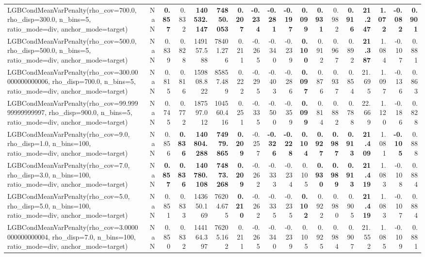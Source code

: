 \documentclass[11pt]{article}
\theoremstyle{plain}
\theoremstyle{definition}
\newcommand{\1}{\mathbf{1}}
\begin{document}
\begin{table}[htbp]
{\begin{tabular}{lrrrrrrrrrrrrrrrrr}
LGBCondMeanVarPenalty(rho\_cov=700.0, rho\_disp=300.0, n\_bins=5, ratio\_mode=div, anchor\_mode=target) & NaN & \textbf{0.857} & 0.832 & \textbf{140532.147} & \textbf{74850.053} & \textbf{0.207} & \textbf{-0.234} & \textbf{-0.281} & \textbf{-0.197} & \textbf{0.099} & \textbf{0.931} & 0.982 & \textbf{0.916} & \textbf{21.247} & \textbf{1.072} & \textbf{-0.082} & \textbf{0.901} \\
LGBCondMeanVarPenalty(rho\_cov=500.0, rho\_disp=500.0, n\_bins=5, ratio\_mode=div, anchor\_mode=target) & NaN & 0.839 & 0.828 & 149157.588 & 78401.276 & 0.211 & -0.265 & -0.340 & -0.239 & \textbf{0.100} & 0.912 & 0.967 & 0.892 & \textbf{21.387} & 1.084 & -0.107 & 0.881 \\
LGBCondMeanVarPenalty(rho\_cov=300.00000000000006, rho\_disp=700.0, n\_bins=5, ratio\_mode=div, anchor\_mode=target) & NaN & 0.815 & 0.816 & 159808.822 & 85857.489 & 0.222 & -0.295 & -0.403 & -0.286 & \textbf{0.097} & 0.876 & 0.937 & 0.854 & 21.695 & 1.097 & -0.136 & 0.863 \\
LGBCondMeanVarPenalty(rho\_cov=99.99999999999997, rho\_disp=900.0, n\_bins=5, ratio\_mode=div, anchor\_mode=target) & NaN & 0.745 & 0.772 & 187597.012 & 104560.416 & 0.251 & -0.335 & -0.500 & -0.359 & \textbf{0.099} & 0.814 & 0.882 & 0.788 & 22.669 & 1.120 & -0.186 & 0.828 \\
LGBCondMeanVarPenalty(rho\_cov=9.0, rho\_disp=1.0, n\_bins=100, ratio\_mode=div, anchor\_mode=target) & NaN & 0.856 & \textbf{0.836} & \textbf{140804.288} & \textbf{74979.865} & \textbf{0.209} & -0.257 & \textbf{-0.326} & \textbf{-0.228} & \textbf{0.104} & \textbf{0.927} & \textbf{0.987} & \textbf{0.913} & \textbf{21.409} & 1.081 & \textbf{-0.105} & 0.888 \\
LGBCondMeanVarPenalty(rho\_cov=7.0, rho\_disp=3.0, n\_bins=100, ratio\_mode=div, anchor\_mode=target) & NaN & \textbf{0.857} & \textbf{0.836} & \textbf{140780.108} & \textbf{74873.268} & \textbf{0.209} & -0.262 & -0.333 & -0.234 & 0.105 & \textbf{0.930} & \textbf{0.989} & \textbf{0.913} & \textbf{21.419} & 1.083 & -0.108 & 0.884 \\
LGBCondMeanVarPenalty(rho\_cov=5.0, rho\_disp=5.0, n\_bins=100, ratio\_mode=div, anchor\_mode=target) & NaN & 0.851 & 0.833 & 143650.169 & 76204.675 & \textbf{0.210} & -0.262 & -0.335 & -0.235 & \textbf{0.102} & 0.922 & 0.980 & 0.905 & \textbf{21.419} & 1.083 & -0.107 & 0.884 \\
LGBCondMeanVarPenalty(rho\_cov=3.0000000000000004, rho\_disp=7.0, n\_bins=100, ratio\_mode=div, anchor\_mode=target) & NaN & 0.850 & 0.832 & 144164.397 & 76205.162 & 0.211 & -0.265 & -0.340 & -0.239 & 0.105 & 0.925 & 0.984 & 0.907 & 21.552 & 1.085 & -0.109 & 0.881 \\

\end{tabular}}
\end{table}
\end{document}
